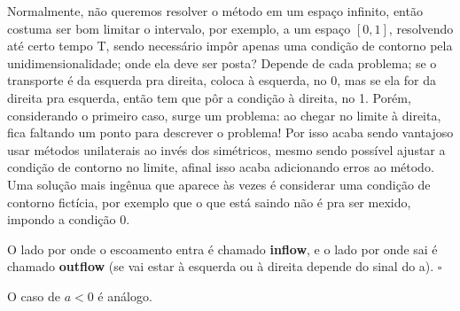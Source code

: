 \documentclass[../differential_methods.tex]{subfiles}
\begin{document}
Normalmente, não queremos resolver o método em um espaço infinito, então costuma ser bom limitar o intervalo, por exemplo, a um espaço \([0, 1]\), resolvendo até certo tempo T, sendo necessário impôr apenas uma condição de contorno pela unidimensionalidade; onde ela deve ser posta? Depende de cada problema; se o transporte é da esquerda pra direita, coloca à esquerda, no 0, mas se ela for da direita pra esquerda, então tem que pôr a condição à direita, no 1.
Porém, considerando o primeiro caso, surge um problema: ao chegar no limite à direita, fica faltando um ponto para descrever o problema! Por isso acaba sendo vantajoso usar métodos unilaterais ao invés dos simétricos, mesmo sendo possível ajustar a condição de contorno no limite, afinal isso acaba adicionando erros ao método. Uma solução mais ingênua que aparece às vezes é considerar uma condição de contorno fictícia, por exemplo que o que está saindo não é pra ser mexido, impondo a condição 0.
\begin{def*}
	O lado por onde o escoamento entra é chamado \textbf{inflow}, e o lado por onde sai é chamado \textbf{outflow} (se vai estar à esquerda ou à direita depende do sinal do a). \(\square\)
\end{def*}
O caso de \(a < 0\) é análogo.
\end{document}
